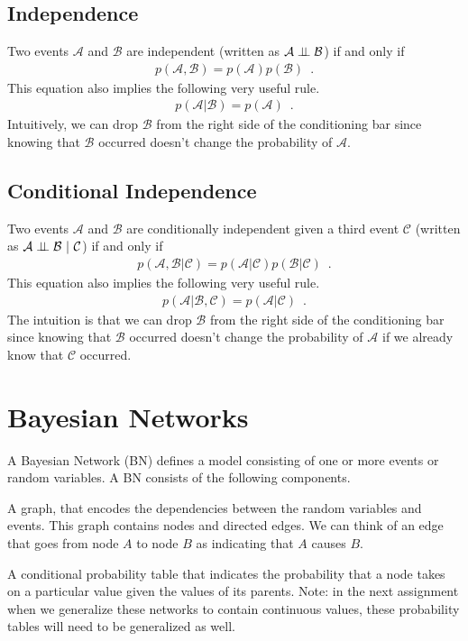 \documentclass{tufte-handout}
\begin{document}
\subsection{Independence}

Two events $\mathcal{A}$ and $\mathcal{B}$ are independent (written as $\mathcal{A} \perp\!\!\!\perp \mathcal{B}$) if and only if
\begin{align}
p(\mathcal{A}, \mathcal{B}) = p(\mathcal{A}) p(\mathcal{B}) \enspace .
\end{align}
This equation also implies the following very useful rule.
\begin{align}
p(\mathcal{A} | \mathcal{B}) = p(\mathcal{A}) \enspace .
\end{align}
Intuitively, we can drop $\mathcal{B}$ from the right side of the conditioning bar since knowing that $\mathcal{B}$ occurred doesn't change the probability of $\mathcal{A}$.


\subsection{Conditional Independence}


Two events $\mathcal{A}$ and $\mathcal{B}$ are conditionally independent given a third event $\mathcal{C}$ (written as $\mathcal{A} \perp\!\!\!\perp \mathcal{B}~|~\mathcal{C}$) if and only if
\begin{align}
p(\mathcal{A}, \mathcal{B} | \mathcal{C}) = p(\mathcal{A} | \mathcal{C}) p(\mathcal{B} | \mathcal{C}) \enspace .
\end{align}
This equation also implies the following very useful rule.
\begin{align}
p(\mathcal{A} | \mathcal{B}, \mathcal{C}) = p(\mathcal{A} | \mathcal{C}) \enspace .
\end{align}
The intuition is that we can drop $\mathcal{B}$ from the right side of the conditioning bar since knowing that $\mathcal{B}$ occurred doesn't change the probability of $\mathcal{A}$ if we already know that $\mathcal{C}$ occurred.


\section{Bayesian Networks}

A Bayesian Network (BN) defines a model consisting of one or more events or random variables.  A BN consists of the following components.
\bi
\item A graph, that encodes the dependencies between the random variables and events.  This graph contains nodes and directed edges.  We can think of an edge that goes from node $A$ to node $B$ as indicating that $A$ causes $B$.
\item A conditional probability table that indicates the probability that a node takes on a particular value given the values of its parents.  Note: in the next assignment when we generalize these networks to contain continuous values, these probability tables will need to be generalized as well.
\ei
\end{document}

